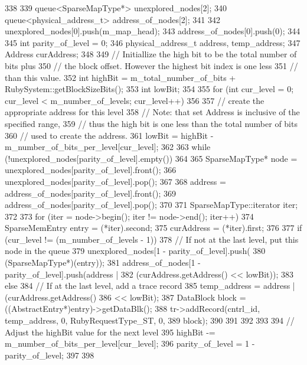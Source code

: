 \begin{DoxyCode}
338 {
339     queue<SparseMapType*> unexplored_nodes[2];
340     queue<physical_address_t> address_of_nodes[2];
341 
342     unexplored_nodes[0].push(m_map_head);
343     address_of_nodes[0].push(0);
344 
345     int parity_of_level = 0;
346     physical_address_t address, temp_address;
347     Address curAddress;
348 
349     // Initiallize the high bit to be the total number of bits plus
350     // the block offset.  However the highest bit index is one less
351     // than this value.
352     int highBit = m_total_number_of_bits + RubySystem::getBlockSizeBits();
353     int lowBit;
354 
355     for (int cur_level = 0; cur_level < m_number_of_levels; cur_level++) {
356 
357         // create the appropriate address for this level
358         // Note: that set Address is inclusive of the specified range,
359         // thus the high bit is one less than the total number of bits
360         // used to create the address.
361         lowBit = highBit - m_number_of_bits_per_level[cur_level];
362 
363         while (!unexplored_nodes[parity_of_level].empty()) {
364 
365             SparseMapType* node = unexplored_nodes[parity_of_level].front();
366             unexplored_nodes[parity_of_level].pop();
367 
368             address = address_of_nodes[parity_of_level].front();
369             address_of_nodes[parity_of_level].pop();
370 
371             SparseMapType::iterator iter;
372 
373             for (iter = node->begin(); iter != node->end(); iter++) {
374                 SparseMemEntry entry = (*iter).second;
375                 curAddress = (*iter).first;
376 
377                 if (cur_level != (m_number_of_levels - 1)) {
378                     // If not at the last level, put this node in the queue
379                     unexplored_nodes[1 - parity_of_level].push(
380                                                      (SparseMapType*)(entry));
381                     address_of_nodes[1 - parity_of_level].push(address |
382                                          (curAddress.getAddress() << lowBit));
383                 } else {
384                     // If at the last level, add a trace record
385                     temp_address = address | (curAddress.getAddress()
386                                                                    << lowBit);
387                     DataBlock block = ((AbstractEntry*)entry)->getDataBlk();
388                     tr->addRecord(cntrl_id, temp_address, 0, RubyRequestType_ST, 
      0,
389                                   block);
390                 }
391             }
392         }
393 
394         // Adjust the highBit value for the next level
395         highBit -= m_number_of_bits_per_level[cur_level];
396         parity_of_level = 1 - parity_of_level;
397     }
398 }
\end{DoxyCode}

